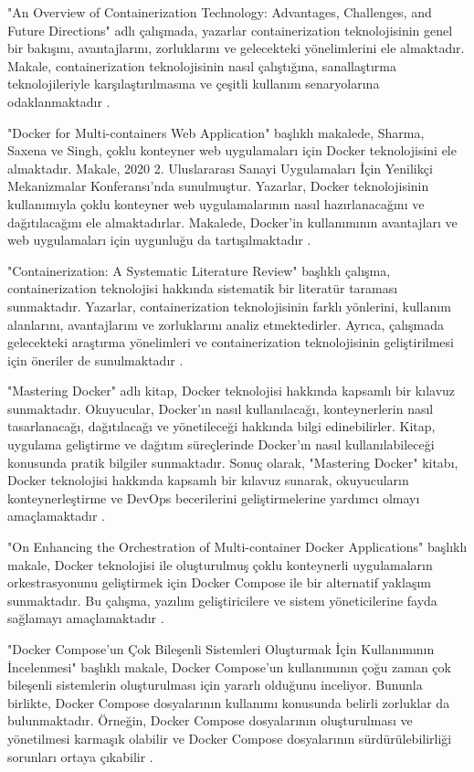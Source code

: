 "An Overview of Containerization Technology: Advantages, Challenges, and Future Directions" adlı çalışmada, yazarlar containerization teknolojisinin genel bir bakışını, avantajlarını, zorluklarını ve gelecekteki yönelimlerini ele almaktadır. Makale, containerization teknolojisinin nasıl çalıştığına, sanallaştırma teknolojileriyle karşılaştırılmasına ve çeşitli kullanım senaryolarına odaklanmaktadır \cite{Smith_Emily}.

"Docker for Multi-containers Web Application" başlıklı makalede, Sharma, Saxena ve Singh, çoklu konteyner web uygulamaları için Docker teknolojisini ele almaktadır. Makale, 2020 2. Uluslararası Sanayi Uygulamaları İçin Yenilikçi Mekanizmalar Konferansı'nda sunulmuştur. Yazarlar, Docker teknolojisinin kullanımıyla çoklu konteyner web uygulamalarının nasıl hazırlanacağını ve dağıtılacağını ele almaktadırlar. Makalede, Docker'in kullanımının avantajları ve web uygulamaları için uygunluğu da tartışılmaktadır \cite{sharma2020docker}.

"Containerization: A Systematic Literature Review" başlıklı çalışma, containerization teknolojisi hakkında sistematik bir literatür taraması sunmaktadır. Yazarlar, containerization teknolojisinin farklı yönlerini, kullanım alanlarını, avantajlarını ve zorluklarını analiz etmektedirler. Ayrıca, çalışmada gelecekteki araştırma yönelimleri ve containerization teknolojisinin geliştirilmesi için öneriler de sunulmaktadır \cite{Brown_Jennifer}.

"Mastering Docker" adlı kitap, Docker teknolojisi hakkında kapsamlı bir kılavuz sunmaktadır. Okuyucular, Docker'ın nasıl kullanılacağı, konteynerlerin nasıl tasarlanacağı, dağıtılacağı ve yönetileceği hakkında bilgi edinebilirler. Kitap, uygulama geliştirme ve dağıtım süreçlerinde Docker'ın nasıl kullanılabileceği konusunda pratik bilgiler sunmaktadır. Sonuç olarak, "Mastering Docker" kitabı, Docker teknolojisi hakkında kapsamlı bir kılavuz sunarak, okuyucuların konteynerleştirme ve DevOps becerilerini geliştirmelerine yardımcı olmayı amaçlamaktadır \cite{mckendrick2020mastering}.

"On Enhancing the Orchestration of Multi-container Docker Applications" başlıklı makale, Docker teknolojisi ile oluşturulmuş çoklu konteynerli uygulamaların orkestrasyonunu geliştirmek için Docker Compose ile bir alternatif yaklaşım sunmaktadır. Bu çalışma, yazılım geliştiricilere ve sistem yöneticilerine fayda sağlamayı amaçlamaktadır \cite{brogi2020enhancing}.

"Docker Compose'un Çok Bileşenli Sistemleri Oluşturmak İçin Kullanımının İncelenmesi" başlıklı makale, Docker Compose'un kullanımının çoğu zaman çok bileşenli sistemlerin oluşturulması için yararlı olduğunu inceliyor. Bununla birlikte, Docker Compose dosyalarının kullanımı konusunda belirli zorluklar da bulunmaktadır. Örneğin, Docker Compose dosyalarının oluşturulması ve yönetilmesi karmaşık olabilir ve Docker Compose dosyalarının sürdürülebilirliği sorunları ortaya çıkabilir \cite{ibrahim2021study}.

